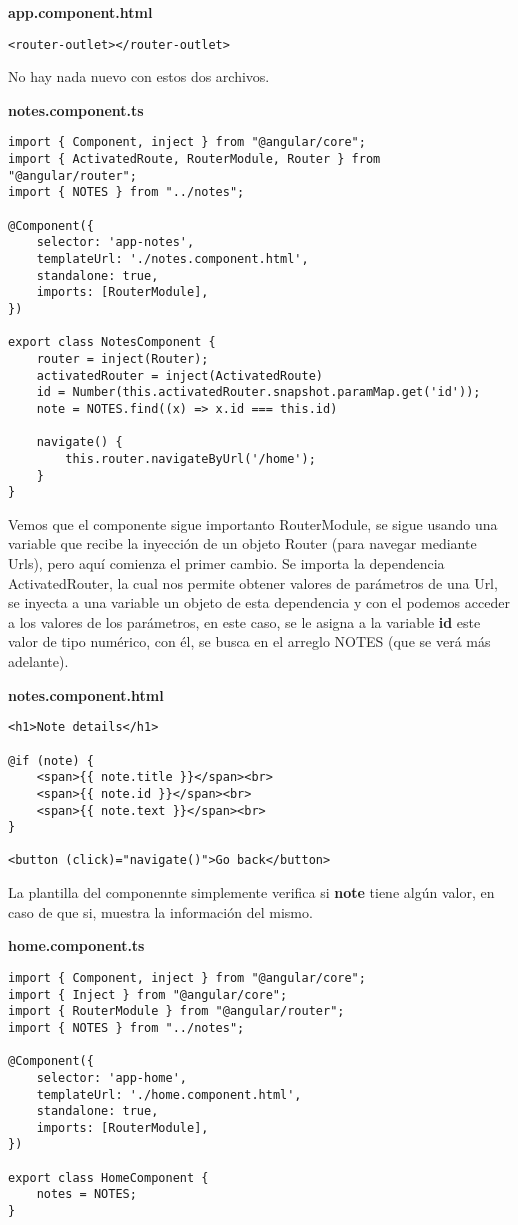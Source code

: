 \textbf{app.component.html}
\begin{lstlisting}[style=htmlcssjs]
<router-outlet></router-outlet>
\end{lstlisting}

No hay nada nuevo con estos dos archivos.

\textbf{notes.component.ts}
\begin{lstlisting}[style=htmlcssjs]
import { Component, inject } from "@angular/core";
import { ActivatedRoute, RouterModule, Router } from "@angular/router";
import { NOTES } from "../notes";

@Component({
    selector: 'app-notes',
    templateUrl: './notes.component.html',
    standalone: true,
    imports: [RouterModule],
})

export class NotesComponent {
    router = inject(Router);
    activatedRouter = inject(ActivatedRoute)
    id = Number(this.activatedRouter.snapshot.paramMap.get('id'));
    note = NOTES.find((x) => x.id === this.id)
    
    navigate() {
        this.router.navigateByUrl('/home');
    }
}
\end{lstlisting}

Vemos que el componente sigue importanto RouterModule, se sigue usando una variable que recibe la inyección de un objeto Router (para navegar mediante Urls), pero aquí comienza el primer cambio. Se importa la dependencia ActivatedRouter, la cual nos permite obtener valores de parámetros de una Url, se inyecta a una variable un objeto de esta dependencia y con el podemos acceder a los valores de los parámetros, en este caso, se le asigna a la variable \textbf{id} este valor de tipo numérico, con él, se busca en el arreglo NOTES (que se verá más adelante).

\textbf{notes.component.html}
\begin{lstlisting}[style=htmlcssjs]
<h1>Note details</h1>

@if (note) {
    <span>{{ note.title }}</span><br>
    <span>{{ note.id }}</span><br>
    <span>{{ note.text }}</span><br>
}

<button (click)="navigate()">Go back</button>
\end{lstlisting}

La plantilla del componennte simplemente verifica si \textbf{note} tiene algún valor, en caso de que si, muestra la información del mismo.

\textbf{home.component.ts}
\begin{lstlisting}[style=htmlcssjs]
import { Component, inject } from "@angular/core";
import { Inject } from "@angular/core";
import { RouterModule } from "@angular/router";
import { NOTES } from "../notes";

@Component({
    selector: 'app-home',
    templateUrl: './home.component.html',
    standalone: true,
    imports: [RouterModule],
})

export class HomeComponent {
    notes = NOTES;
}
\end{lstlisting}

